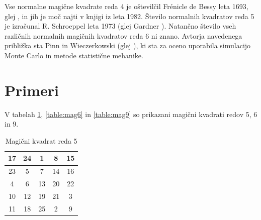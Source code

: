 \documentclass[a4paper,12pt]{article}
\newenvironment{magic}[3]{\begin{table}[!ht]
   \centering
   \caption{#1}
   \label{#2}
   \large
   \begin{tabular}{|*{#3}{c|}}
   \hline}{ \end{tabular}
   \normalsize
\end{table}}
\theoremstyle{definition}
\theoremstyle{plain}
\begin{document}
Vse normalne magične kvadrate reda 4 je oštevilčil Frénicle de Bessy
leta 1693, glej \cite{bessy}, in jih je moč najti v knjigi \cite{berlekamp}
iz leta 1982. Število normalnih kvadratov reda 5 je izračunal
R. Schroeppel leta 1973 (glej Gardner \cite{gardner}).
Natančno število vseh različnih normalnih magičnih kvadratov reda 6 ni znano.
Avtorja navedenega približka sta Pinn in Wieczerkowski (glej \cite{pinn}), ki
sta za oceno uporabila simulacijo Monte Carlo in metode statistične mehanike.


\section{Primeri}

V tabelah \ref{table:mag5}, \ref{table:mag6} in \ref{table:mag9} so prikazani
magični kvadrati redov 5, 6 in 9. %

\begin{magic}{Magični kvadrat reda 5}{table:mag5}{5}
   17 & 24 &  1 &  8 & 15 \\\hline
   23 &  5 &  7 & 14 & 16 \\\hline
    4 &  6 & 13 & 20 & 22 \\\hline
   10 & 12 & 19 & 21 &  3 \\\hline
   11 & 18 & 25 &  2 &  9 \\\hline
\end{magic}

\end{document}
